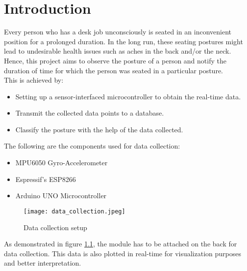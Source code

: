 \documentclass[./main.tex]{subfiles}
\begin{document}
\chapter{Introduction}\label{chap:intro}
Every person who has a desk job unconsciously is seated in an inconvenient
position for a prolonged duration. In the long run, these seating postures
might lead to undesirable health issues such as aches in the back and/or the
neck. Hence, this project aims to observe the posture of a person and notify
the duration of time for which the person was seated in a particular posture.
\\
This is achieved by:
\begin{itemize}
    \item Setting up a sensor-interfaced microcontroller to obtain the
        real-time data.
    \item Transmit the collected data points to a database.
    \item Classify the posture with the help of the data collected.
\end{itemize}

The following are the components used for data collection:
\begin{itemize}
    \item MPU6050 Gyro-Accelerometer
    \item Espressif's ESP8266
    \item Arduino UNO Microcontroller
\end{itemize}

\begin{figure}[H]
    \centering
    \texttt{[image: data\_collection.jpeg]}
    \caption{Data collection setup}
    \label{fig:datacollect}
\end{figure}

As demonstrated in figure \ref{fig:datacollect}, the module has to be attached
on the back for data collection. This data is also plotted in real-time for
visualization purposes and better interpretation.
\end{document}
